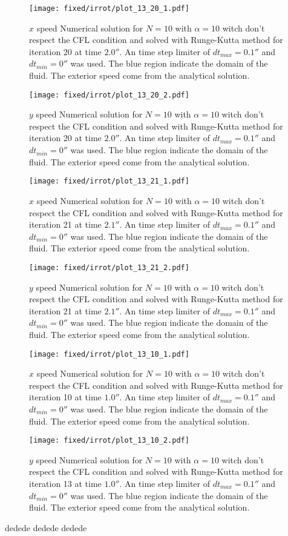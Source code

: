 \begin{figure}
\texttt{[image: fixed/irrot/plot\_13\_20\_1.pdf]}
\caption{$x$ speed Numerical solution for $N=10$ with $\alpha=10$ witch don't respect the CFL condition and solved with Runge-Kutta method
for iteration 20 at time $\unit{2.0}{\second}$.
An time step limiter of $dt_{max}=\unit{0.1}{\second}$ and $dt_{min}=\unit{0}{\second}$ was used.
The blue region indicate the domain of the fluid. The exterior speed come from the analytical solution.
}
\end{figure}
\begin{figure}
\texttt{[image: fixed/irrot/plot\_13\_20\_2.pdf]}
\caption{$y$ speed Numerical solution for $N=10$ with $\alpha=10$ witch don't respect the CFL condition and solved with Runge-Kutta method
for iteration 20 at time $\unit{2.0}{\second}$.
An time step limiter of $dt_{max}=\unit{0.1}{\second}$ and $dt_{min}=\unit{0}{\second}$ was used.
The blue region indicate the domain of the fluid. The exterior speed come from the analytical solution.
}
\end{figure}
\begin{figure}
\texttt{[image: fixed/irrot/plot\_13\_21\_1.pdf]}
\caption{$x$ speed Numerical solution for $N=10$ with $\alpha=10$ witch don't respect the CFL condition and solved with Runge-Kutta method
for iteration 21 at time $\unit{2.1}{\second}$.
An time step limiter of $dt_{max}=\unit{0.1}{\second}$ and $dt_{min}=\unit{0}{\second}$ was used.
The blue region indicate the domain of the fluid. The exterior speed come from the analytical solution.
}
\end{figure}
\begin{figure}
\texttt{[image: fixed/irrot/plot\_13\_21\_2.pdf]}
\caption{$y$ speed Numerical solution for $N=10$ with $\alpha=10$ witch don't respect the CFL condition and solved with Runge-Kutta method
for iteration 21 at time $\unit{2.1}{\second}$.
An time step limiter of $dt_{max}=\unit{0.1}{\second}$ and $dt_{min}=\unit{0}{\second}$ was used.
The blue region indicate the domain of the fluid. The exterior speed come from the analytical solution.
}
\end{figure}

\begin{figure}
\texttt{[image: fixed/irrot/plot\_13\_10\_1.pdf]}
\caption{$x$ speed Numerical solution for $N=10$ with $\alpha=10$ witch don't respect the CFL condition and solved with Runge-Kutta method
for iteration 10 at time $\unit{1.0}{\second}$.
An time step limiter of $dt_{max}=\unit{0.1}{\second}$ and $dt_{min}=\unit{0}{\second}$ was used.
The blue region indicate the domain of the fluid. The exterior speed come from the analytical solution.
}
\end{figure}
\begin{figure}
\texttt{[image: fixed/irrot/plot\_13\_10\_2.pdf]}
\caption{$y$ speed Numerical solution for $N=10$ with $\alpha=10$ witch don't respect the CFL condition and solved with Runge-Kutta method
for iteration 13 at time $\unit{1.0}{\second}$.
An time step limiter of $dt_{max}=\unit{0.1}{\second}$ and $dt_{min}=\unit{0}{\second}$ was used.
The blue region indicate the domain of the fluid. The exterior speed come from the analytical solution.
}
\end{figure}
dedede dedede dedede

